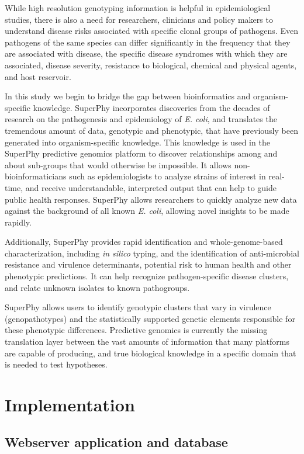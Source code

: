 \documentclass{bmcart}
\begin{document}
While high resolution genotyping information is helpful in epidemiological studies, there is also a need for researchers, clinicians and policy makers to understand disease risks associated with specific clonal groups of pathogens. Even pathogens of the same species can differ significantly in the frequency that they are associated with disease, the specific disease syndromes with which they are associated, disease severity, resistance to biological, chemical and physical agents, and host reservoir.

In this study we begin to bridge the gap between bioinformatics and organism-specific knowledge. SuperPhy incorporates discoveries from the decades of research on the pathogenesis and epidemiology of \textit{E. coli}, and translates the tremendous amount of data, genotypic and phenotypic, that have previously been generated into organism-specific knowledge. This knowledge is used in the SuperPhy predictive genomics platform to discover relationships among and about sub-groups that would otherwise be impossible. It allows non-bioinformaticians such as epidemiologists to analyze strains of interest in real-time, and receive understandable, interpreted output that can help to guide public health responses. SuperPhy allows researchers to quickly analyze new data against the background of all known \textit{E. coli}, allowing novel insights to be made rapidly.

Additionally, SuperPhy provides rapid identification and whole-genome-based characterization, including \textit{in silico} typing, and the identification of anti-microbial resistance and virulence determinants, potential risk to human health and other phenotypic predictions. It can help recognize pathogen-specific disease clusters, and relate unknown isolates to known pathogroups.

SuperPhy allows users to identify genotypic clusters that vary in virulence (genopathotypes) and the statistically supported genetic elements responsible for these phenotypic differences. Predictive genomics is currently the missing translation layer between the vast amounts of information that many platforms are capable of producing, and true biological knowledge in a specific domain that is needed to test hypotheses.


\section*{Implementation}
\subsection{Webserver application and database}
\end{document}
